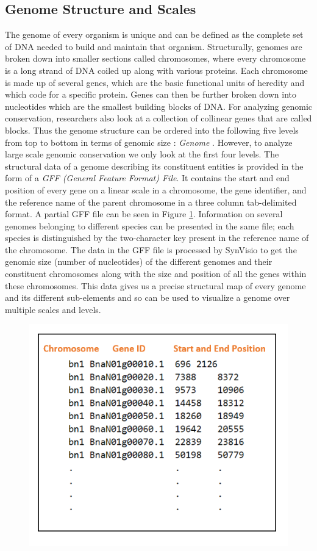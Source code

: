 \subsection{Genome Structure and Scales}
The genome of every organism is unique and can be defined as the complete set of DNA needed to build and maintain that organism. Structurally, genomes are broken down into smaller sections called chromosomes, where every chromosome is a long strand of DNA coiled up along with various proteins. Each chromosome is made up of several genes, which are the basic functional units of heredity and which code for a specific protein. Genes can then be further broken down into nucleotides which are the smallest building blocks of DNA. For analyzing genomic conservation, researchers also look at a collection of collinear genes that are called blocks. Thus the genome structure can be ordered into the following five levels from top to bottom in terms of genomic size : \textit{Genome }. However, to analyze large scale genomic conservation we only look at the first four levels. The structural data of a genome describing its constituent entities is provided in the form of a \textit{GFF (General Feature Format) File}. It contains the start and end position of every gene on a linear scale in a chromosome, the gene identifier, and the reference name of the parent chromosome in a three column tab-delimited format. A partial GFF file can be seen in Figure \ref{fig:ch_3_gff_file}.  Information on several genomes belonging to different species can be presented in the same file; each species is distinguished by the two-character key present in the reference name of the chromosome. The data in the GFF file is processed by SynVisio to get the genomic size (number of nucleotides) of the different genomes and their constituent chromosomes along with the size and position of all the genes within these chromosomes. This data gives us a precise structural map of every genome and its different sub-elements and so can be used to visualize a genome over multiple scales and levels.

\begin{figure}
  \centering
  \includegraphics[width=.55\linewidth]{images/ch_3_gff_file.PNG}
  \label{fig:ch_3_gff_file}
\end{figure}


